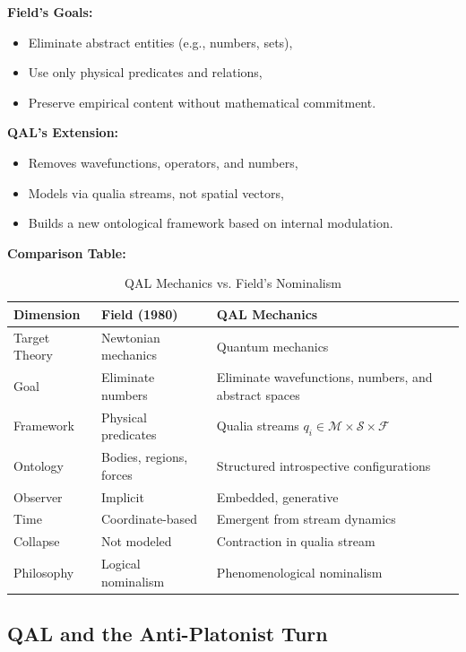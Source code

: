 \documentclass[11pt]{article}
\numberwithin{equation}{section} %
\begin{document}
\bigskip

\textbf{Field's Goals:}
\begin{itemize}
  \item Eliminate abstract entities (e.g., numbers, sets),
  \item Use only physical predicates and relations,
  \item Preserve empirical content without mathematical commitment.
\end{itemize}

\bigskip

\textbf{QAL's Extension:}
\begin{itemize}
  \item Removes wavefunctions, operators, and numbers,
  \item Models via qualia streams, not spatial vectors,
  \item Builds a new ontological framework based on internal modulation.
\end{itemize}

\bigskip

\textbf{Comparison Table:}
\begin{table}[h!]
\centering
\caption{QAL Mechanics vs. Field's Nominalism}
\renewcommand{\arraystretch}{1.4}
\begin{tabular}{|p{5cm}|p{5cm}|p{5cm}|}
\hline
\textbf{Dimension} & \textbf{Field (1980)} & \textbf{QAL Mechanics} \\
\hline
Target Theory & Newtonian mechanics & Quantum mechanics \\
\hline
Goal & Eliminate numbers & Eliminate wavefunctions, numbers, and abstract spaces \\
\hline
Framework & Physical predicates & Qualia streams \( q_i \in \mathcal{M} \times \mathcal{S} \times \mathcal{F} \) \\
\hline
Ontology & Bodies, regions, forces & Structured introspective configurations \\
\hline
Observer & Implicit & Embedded, generative \\
\hline
Time & Coordinate-based & Emergent from stream dynamics \\
\hline
Collapse & Not modeled & Contraction in qualia stream \\
\hline
Philosophy & Logical nominalism & Phenomenological nominalism \\
\hline
\end{tabular}
\end{table}

\subsection{QAL and the Anti-Platonist Turn}
\end{document}
